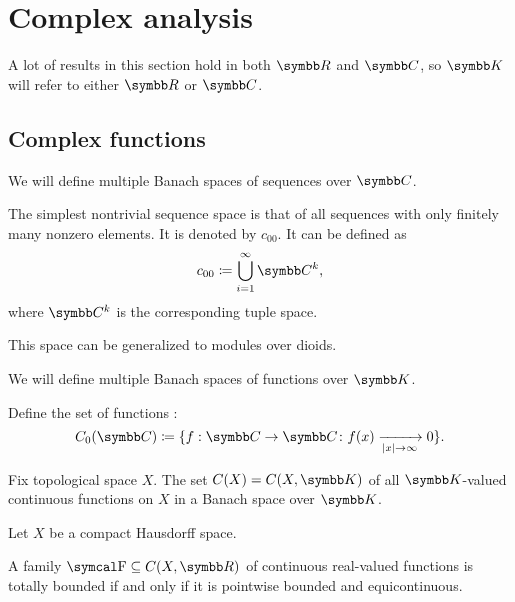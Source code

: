 \section{Complex analysis}\label{sec:complex_analysis}

A lot of results in this section hold in both \( \BR \) and \( \BC \), so \( \BK \) will refer to either \( \BR \) or \( \BC \).

\subsection{Complex functions}\label{subsec:complex_functions}

\begin{definition}\label{def:sequence_spaces}
  We will define multiple Banach spaces of sequences over \( \BC \).

  \begin{defenum}
     The simplest nontrivial sequence space is that of all sequences with only finitely many nonzero elements. It is denoted by \( c_{00} \). It can be defined as
    \begin{equation*}
      c_{00} \coloneqq \bigcup_{i=1}^\infty \BC^k,
    \end{equation*}
    where \( \BC^k \) is the corresponding tuple space.

    This space can be generalized to modules over dioids.
  \end{defenum}
\end{definition}

\begin{definition}\label{def:function_spaces}
  We will define multiple Banach spaces of functions over \( \BK \).

  \begin{defenum}
     Define the set of functions :
    \begin{equation*}
      C_0(\BC) \coloneqq \{ f: \BC \to \BC \colon f(x) \xrightarrow[\Abs{x} \to \infty]{} 0 \}.
    \end{equation*}

     Fix topological space \( X \). The set \( C(X) = C(X, \BK) \) of all \( \BK \)-valued continuous functions on \( X \) in a Banach space over \( \BK \).
  \end{defenum}
\end{definition}

\begin{theorem}\label{thm:arzela_ascoli}\cite[corollary 10.49]{Knapp2016BAlg}
  Let \( X \) be a compact Hausdorff space.

  A family \( \CF \subseteq C(X, \BR) \) of continuous real-valued functions is totally bounded if and only if it is pointwise bounded and equicontinuous.
\end{theorem}
